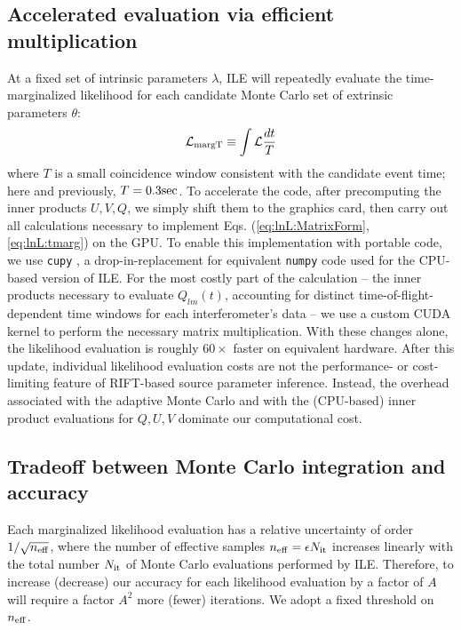 \documentclass[twocolumn,prd,nofootinbib]{revtex4}
\newcommand\unit[1]{{\rm #1}}
\newcommand\ILE{ILE}
\begin{document}
\subsection{Accelerated evaluation via efficient multiplication}


At a fixed set of intrinsic parameters $\lambda$, \ILE{} will repeatedly evaluate the time-marginalized likelihood 
for each candidate Monte Carlo set of extrinsic parameters $\theta$:
\begin{eqnarray}
{\cal L}_{\rm margT} \equiv  \int {\cal L} \frac{dt}{T}
\label{eq:lnL:tmarg}
\end{eqnarray}
where $T$ is a small coincidence window consistent with the candidate event time; here and previously,
$T=0.3\unit{sec}$.   To accelerate the code, after precomputing the inner products $U,V,Q$, we simply shift them to the
graphics card, then carry out all calculations necessary to implement Eqs. (\ref{eq:lnL:MatrixForm}, \ref{eq:lnL:tmarg})
on the GPU.  To enable this implementation with portable code, we use \texttt{cupy} \cite{cupy_learningsys2017}, a drop-in-replacement for equivalent
\texttt{numpy} code used for the CPU-based version of ILE.    For the most costly part of the calculation -- the inner
products necessary to evaluate $Q_{lm}(t)$, accounting for distinct time-of-flight-dependent time windows for each
interferometer's data -- we use a custom CUDA kernel to perform the necessary matrix multiplication.  
%
With these changes alone, the likelihood evaluation is roughly $60\times$ faster on equivalent hardware.  
After this update, individual likelihood evaluation costs are not the performance- or cost-limiting feature of RIFT-based source
parameter inference.  Instead, the overhead associated with the adaptive Monte Carlo and with the (CPU-based) inner
product evaluations for $Q,U,V$ dominate our computational cost.



\subsection{Tradeoff between Monte Carlo integration and accuracy}

Each marginalized likelihood evaluation has a relative uncertainty of order  $1/\sqrt{n_{\rm eff}}$, where the number of
effective samples $n_{\rm eff}=\epsilon N_{\rm it}$ increases linearly with the total number $N_{\rm it}$ of Monte Carlo
evaluations performed by \ILE{}.  Therefore, to increase (decrease) our accuracy for each likelihood evaluation by a factor of $A$
will require a factor $A^2$ more (fewer) iterations.   
%
We adopt a fixed threshold on $n_{\rm eff}$.  
\end{document}
